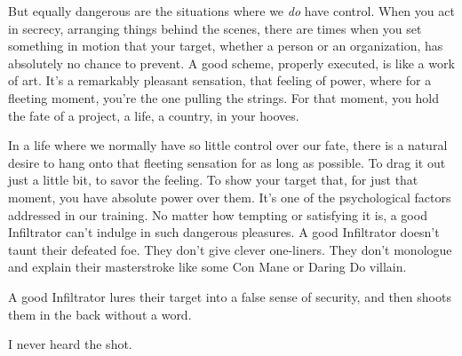 But equally dangerous are the situations where we \textit{do} have control. When you act in secrecy, arranging things behind the scenes, there are times when you set something in motion that your target, whether a person or an organization, has absolutely no chance to prevent. A good scheme, properly executed, is like a work of art. It’s a remarkably pleasant sensation, that feeling of power, where for a fleeting moment, you’re the one pulling the strings. For that moment, you hold the fate of a project, a life, a country, in your hooves.

In a life where we normally have so little control over our fate, there is a natural desire to hang onto that fleeting sensation for as long as possible. To drag it out just a little bit, to savor the feeling. To show your target that, for just that moment, you have absolute power over them. It’s one of the psychological factors addressed in our training. No matter how tempting or satisfying it is, a good Infiltrator can’t indulge in such dangerous pleasures. A good Infiltrator doesn’t taunt their defeated foe. They don’t give clever one-liners. They don’t monologue and explain their masterstroke like some Con Mane or Daring Do villain.

A good Infiltrator lures their target into a false sense of security, and then shoots them in the back without a word.

I never heard the shot.